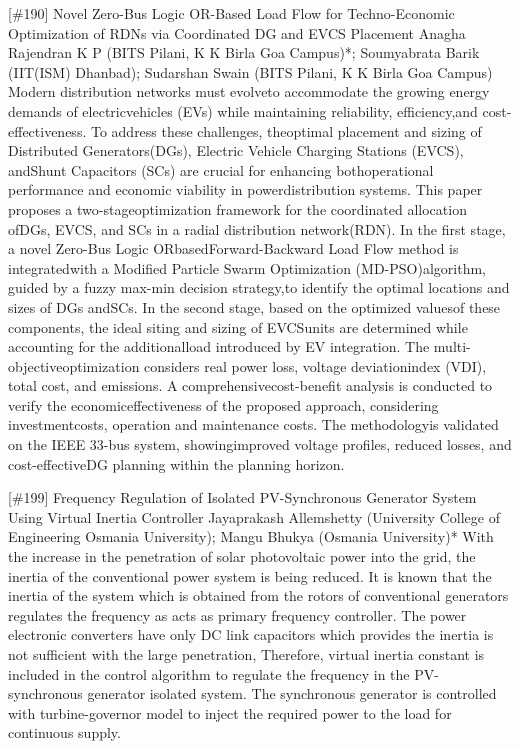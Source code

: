{} \begin{abstract_online} {[\#190] Novel Zero-Bus Logic OR-Based Load Flow for Techno-Economic Optimization of RDNs via Coordinated DG and EVCS Placement} {} {Anagha Rajendran K P (BITS Pilani, K K Birla Goa Campus)*; Soumyabrata Barik (IIT(ISM) Dhanbad); Sudarshan  Swain (BITS Pilani, K K Birla Goa Campus)} {} Modern distribution networks must evolveto accommodate the growing energy demands of electricvehicles (EVs) while maintaining reliability, efficiency,and cost-effectiveness. To address these challenges, theoptimal placement and sizing of Distributed Generators(DGs), Electric Vehicle Charging Stations (EVCS), andShunt Capacitors (SCs) are crucial for enhancing bothoperational performance and economic viability in powerdistribution systems. This paper proposes a two-stageoptimization framework for the coordinated allocation ofDGs, EVCS, and SCs in a radial distribution network(RDN). In the first stage, a novel Zero-Bus Logic ORbasedForward-Backward Load Flow method is integratedwith a Modified Particle Swarm Optimization (MD-PSO)algorithm, guided by a fuzzy max-min decision strategy,to identify the optimal locations and sizes of DGs andSCs. In the second stage, based on the optimized valuesof these components, the ideal siting and sizing of EVCSunits are determined while accounting for the additionalload introduced by EV integration. The multi-objectiveoptimization considers real power loss, voltage deviationindex (VDI), total cost, and emissions. A comprehensivecost-benefit analysis is conducted to verify the economiceffectiveness of the proposed approach, considering investmentcosts, operation and maintenance costs. The methodologyis validated on the IEEE 33-bus system, showingimproved voltage profiles, reduced losses, and cost-effectiveDG planning within the planning horizon. \end{abstract_online} 
{} \begin{abstract_online} {[\#199] Frequency Regulation of Isolated PV-Synchronous Generator System Using Virtual Inertia Controller } {} {Jayaprakash Allemshetty (University College of Engineering Osmania University); Mangu Bhukya (Osmania University)*} {} With the increase in the penetration of solar photovoltaic power into the grid, the inertia of the conventional power system is being reduced. It is known that the inertia of the system which is obtained from the rotors of conventional generators regulates the frequency as acts as primary frequency controller. The power electronic converters have only DC link capacitors which provides the inertia is not sufficient with the large penetration, Therefore, virtual inertia constant is included in the control algorithm to regulate the frequency in the PV-synchronous generator isolated system. The synchronous generator is controlled with turbine-governor model to inject the required power to the load for continuous supply.  \end{abstract_online} 
